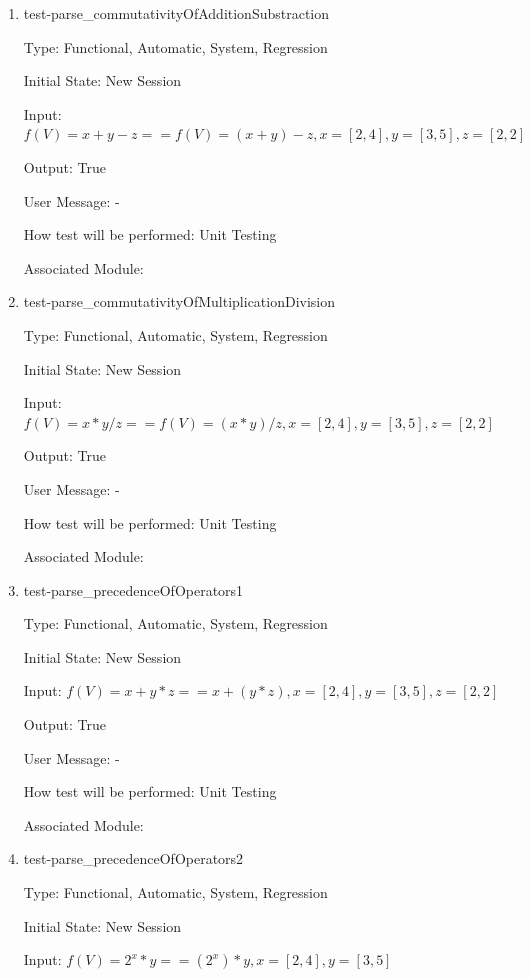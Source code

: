 \documentclass[12pt, titlepage]{article}
\begin{document}
\begin{enumerate}
	
	\item{test-parse\_commutativityOfAdditionSubstraction}
	
	Type: Functional, Automatic, System, Regression
	
	Initial State: New Session
	
	Input: $f(V) = x + y - z == f(V) = (x + y) - z, x = [2,4], y = [3,5], z = 
	[2,2]$
	
	Output: True
	
	User Message: - 
	
	How test will be performed: Unit Testing
	
	Associated Module: \\
	
	\item{test-parse\_commutativityOfMultiplicationDivision}
	
	Type: Functional, Automatic, System, Regression
	
	Initial State: New Session
	
	Input: $f(V) = x * y / z == f(V) = (x * y) / z, x = [2,4], y = [3,5], z = 
	[2,2]$
	
	Output: True
	
	User Message: - 
	
	How test will be performed: Unit Testing
	
	Associated Module: \\
	
	\item{test-parse\_precedenceOfOperators1}
	
	Type: Functional, Automatic, System, Regression
	
	Initial State: New Session
	
	Input: $f(V) = x + y * z == x + (y * z), x = [2,4], y = [3,5], z = [2,2]$
	
	Output: True
	
	User Message: - 
	
	How test will be performed: Unit Testing
	
	Associated Module: \\
	
	\item{test-parse\_precedenceOfOperators2}
	
	Type: Functional, Automatic, System, Regression
	
	Initial State: New Session
	
	Input: $f(V) = 2^x * y == (2^x) * y, x = [2,4], y = [3,5]$
	

\end{enumerate}
\end{document}
